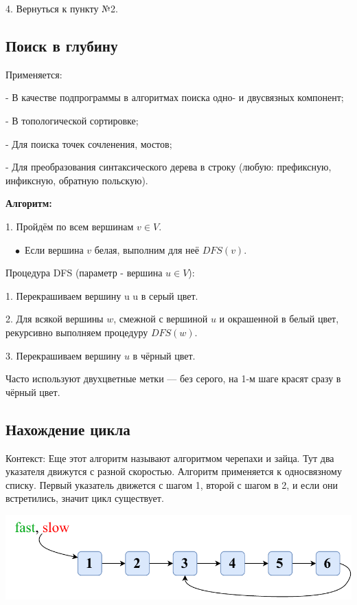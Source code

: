 \documentclass[utf8,14pt,a4paper,oneside,russian]{book}
\begin{document}
	4. Вернуться к пункту №2.
	
	\subsection{Поиск в глубину}
	
	Применяется:
	
	- В качестве подпрограммы в алгоритмах поиска одно- и двусвязных компонент;
	
	- В топологической сортировке;
	
	- Для поиска точек сочленения, мостов;
	
	- Для преобразования синтаксического дерева в строку (любую: префиксную, инфиксную, обратную польскую).
	
	\textbf{Алгоритм:}
	
	1. Пройдём по всем вершинам $v \in V$.
	
	$\; \; \; \bullet$ Если вершина $v$ белая, выполним для неё $DFS(v)$.
	
	Процедура DFS (параметр - вершина $u\in V$):
	
	1. Перекрашиваем вершину u u в серый цвет.
	
	2. Для всякой вершины $w$, смежной с вершиной $u$ и окрашенной в белый цвет, рекурсивно выполняем процедуру $DFS(w)$.
	
	3. Перекрашиваем вершину $u$ в чёрный цвет.
	
	Часто используют двухцветные метки — без серого, на 1-м шаге красят сразу в чёрный цвет.
	
	\subsection{Нахождение цикла}
	
	Контекст: Еще этот алгоритм называют алгоритмом черепахи и зайца. Тут два указателя движутся с разной скоростью. Алгоритм применяется к односвязному списку. Первый указатель движется с шагом 1, второй с шагом в 2, и если они встретились, значит цикл существует.
	
	\begin{center}
		\includegraphics[scale=0.8]{1}\\
	\end{center}
\end{document}
